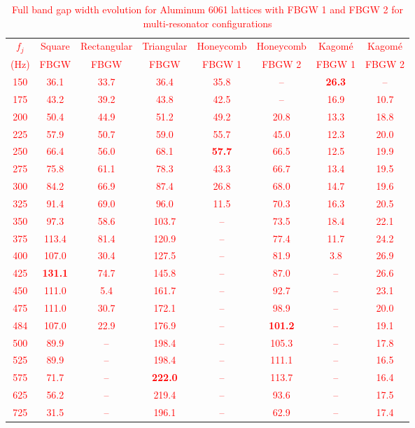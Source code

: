 \documentclass[review,numbers,sort&compress]{elsarticle}
\begin{document}
{\textcolor{red}{\begin{table}[!htb]
\centering
\caption{Full band gap width evolution for Aluminum 6061 lattices with FBGW 1 and FBGW 2 for multi-resonator configurations\protect\footnotemark[1]}
\label{tab:aluminum_results}
\small
\begin{tabular}{cccccccc}
\hline
$f_j$ & Square & Rectangular & Triangular & Honeycomb & Honeycomb & Kagom\'{e} & Kagom\'{e} \\
(Hz) & FBGW & FBGW & FBGW & FBGW 1 & FBGW 2 & FBGW 1 & FBGW 2 \\
\hline
150 & 36.1 & 33.7 & 36.4 & 35.8 & -- & \textbf{26.3} & -- \\
175 & 43.2 & 39.2 & 43.8 & 42.5 & -- & 16.9 & 10.7 \\
200 & 50.4 & 44.9 & 51.2 & 49.2 & 20.8 & 13.3 & 18.8 \\
225 & 57.9 & 50.7 & 59.0 & 55.7 & 45.0 & 12.3 & 20.0 \\
250 & 66.4 & 56.0 & 68.1 & \textbf{57.7} & 66.5 & 12.5 & 19.9 \\
275 & 75.8 & 61.1 & 78.3 & 43.3 & 66.7 & 13.4 & 19.5 \\
300 & 84.2 & 66.9 & 87.4 & 26.8 & 68.0 & 14.7 & 19.6 \\
325 & 91.4 & 69.0 & 96.0 & 11.5 & 70.3 & 16.3 & 20.5 \\
350 & 97.3 & 58.6 & 103.7 & -- & 73.5 & 18.4 & 22.1 \\
375 & 113.4 & 81.4 & 120.9 & -- & 77.4 & 11.7 & 24.2 \\
400 & 107.0 & 30.4 & 127.5 & -- & 81.9 & 3.8 & 26.9 \\
425 & \textbf{131.1} & 74.7 & 145.8 & -- & 87.0 & -- & 26.6 \\
450 & 111.0 & 5.4 & 161.7 & -- & 92.7 & -- & 23.1 \\
475 & 111.0 & 30.7 & 172.1 & -- & 98.9 & -- & 20.0 \\
484\protect\footnotemark[2] & 107.0 & 22.9 & 176.9 & -- & \textbf{101.2} & -- & 19.1 \\
500 & 89.9 & -- & 198.4 & -- & 105.3 & -- & 17.8 \\
525 & 89.9 & -- & 198.4 & -- & 111.1 & -- & 16.5 \\
575 & 71.7 & -- & \textbf{222.0} & -- & 113.7 & -- & 16.4 \\
625 & 56.2 & -- & 219.4 & -- & 93.6 & -- & 17.5 \\
725 & 31.5 & -- & 196.1 & -- & 62.9 & -- & 17.4 \\
\hline
\end{tabular}
\end{table}}

}
\end{document}
